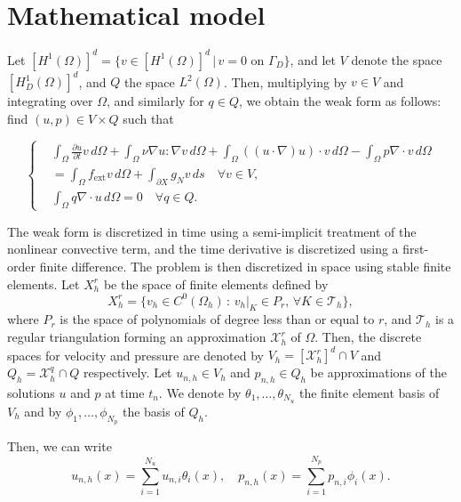 \documentclass{article}
\begin{document}
\section{Mathematical model}
Let \( [H^1(\Omega)]^d = \{ v \in [H^1(\Omega)]^d \,|\, v = 0 \text{ on } \Gamma_D \} \), and let \( V \) denote the space \( [H^1_D(\Omega)]^d \), and \( Q \) the space \( L^2(\Omega) \). Then, multiplying by \( v \in V \) and integrating over \( \Omega \), and similarly for \( q \in Q \), we obtain the weak form as follows: find \( (u, p) \in V \times Q \) such that

\begin{equation}
\left\{
\begin{aligned}
    &\int_\Omega \frac{\partial u}{\partial t} v \,d\Omega + \int_\Omega \nu \nabla u : \nabla v \,d\Omega + \int_\Omega \left((u \cdot \nabla)u \right) \cdot v \,d\Omega - \int_\Omega p \nabla \cdot v \,d\Omega \\
    &= \int_\Omega f_{\text{ext}} v \,d\Omega + \int_{\partial X} g_N v \,ds \quad \forall v \in V, \\
    &\int_\Omega q \nabla \cdot u \,d\Omega = 0 \quad \forall q \in Q.
\end{aligned}
\right.
\label{eq:weak_formulation}
\end{equation}


The weak form is discretized in time using a semi-implicit treatment of the nonlinear convective term, and the time derivative is discretized using a first-order finite difference. The problem is then discretized in space using stable finite elements. Let $X_h^r$ be the space of finite elements defined by
\[
X_h^r = \{ v_h \in C^0(\Omega_h) \,: \,v_h|_K \in P_r, \, \forall K \in \mathcal{T}_h \},
\]
where \(P_r\) is the space of polynomials of degree less than or equal to \(r\), and \(\mathcal{T}_h\) is a regular triangulation forming an approximation \(\mathcal{X}_h^r\) of \(\Omega\). Then, the discrete spaces for velocity and pressure are denoted by \(V_h = [\mathcal{X}_h^r]^d \cap V\) and \(Q_h = \mathcal{X}_h^q \cap Q\) respectively. Let \(u_{n,h} \in V_h\) and \(p_{n,h} \in Q_h\) be approximations of the solutions \(u\) and \(p\) at time \(t_n\). We denote by \(\theta_1, \ldots, \theta_{N_u}\) the finite element basis of \(V_h\) and by \(\phi_1, \ldots, \phi_{N_p}\) the basis of \(Q_h\).

Then, we can write
\[
u_{n,h}(x) = \sum_{i=1}^{N_u} u_{n,i} \theta_i(x), \quad p_{n,h}(x) = \sum_{i=1}^{N_p} p_{n,i} \phi_i(x).
\]
\end{document}
